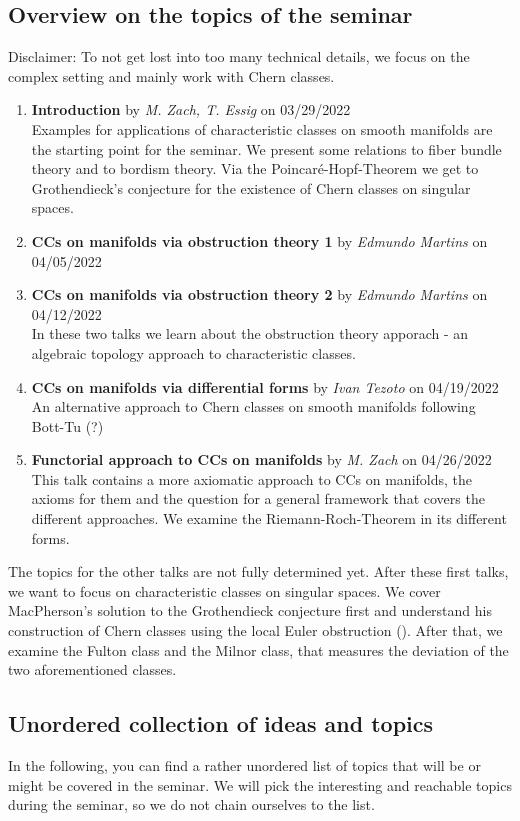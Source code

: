 \documentclass[a4paper]{article}
\begin{document}
\subsection*{Overview on the topics of the seminar}
Disclaimer: To not get lost into too many technical details, we focus on the complex setting
and mainly work with Chern classes.

\begin{enumerate}
\item \textbf{Introduction} by \emph{M. Zach, T. Essig} on 03/29/2022 \\
	Examples for applications of characteristic classes on smooth manifolds are the
	starting point for the seminar. We present some relations to fiber bundle theory 
	and to bordism theory. Via the Poincar\'e-Hopf-Theorem we get to Grothendieck's 
	conjecture for the existence of Chern classes on singular spaces.
\item \textbf{CCs on manifolds via obstruction theory 1} by \emph{Edmundo Martins} on 04/05/2022
\item \textbf{CCs on manifolds via obstruction theory 2} by \emph{Edmundo Martins} on 04/12/2022\\
	In these two talks we learn about the obstruction theory apporach - an algebraic 
	topology approach to characteristic classes.
\item \textbf{CCs on manifolds via differential forms} by \emph{Ivan Tezoto} on 04/19/2022 \\
	An alternative approach to Chern classes on smooth manifolds following Bott-Tu (?)
\item \textbf{Functorial approach to CCs on manifolds} by \emph{M. Zach} on 04/26/2022 \\
	This talk contains a more axiomatic approach to CCs on manifolds, the axioms
	for them and the question for a general framework that covers the different approaches.
	We examine the Riemann-Roch-Theorem in its different forms.
\end{enumerate}
The topics for the other talks are not fully determined yet. After these first talks, we want
to focus on characteristic classes on singular spaces. We cover MacPherson's solution to 
the Grothendieck conjecture first and understand his construction of Chern classes using the
local Euler obstruction (\cite{MacPherson74,Parusinski06}). After that, we examine the Fulton 
class and the Milnor class, that measures the deviation of the two aforementioned classes.

\subsection*{Unordered collection of ideas and topics}
In the following, you can find a rather unordered list of topics that will be or might be
covered in the seminar. We will pick the interesting and reachable topics during the seminar,
so we do not chain ourselves to the list.
\end{document}
